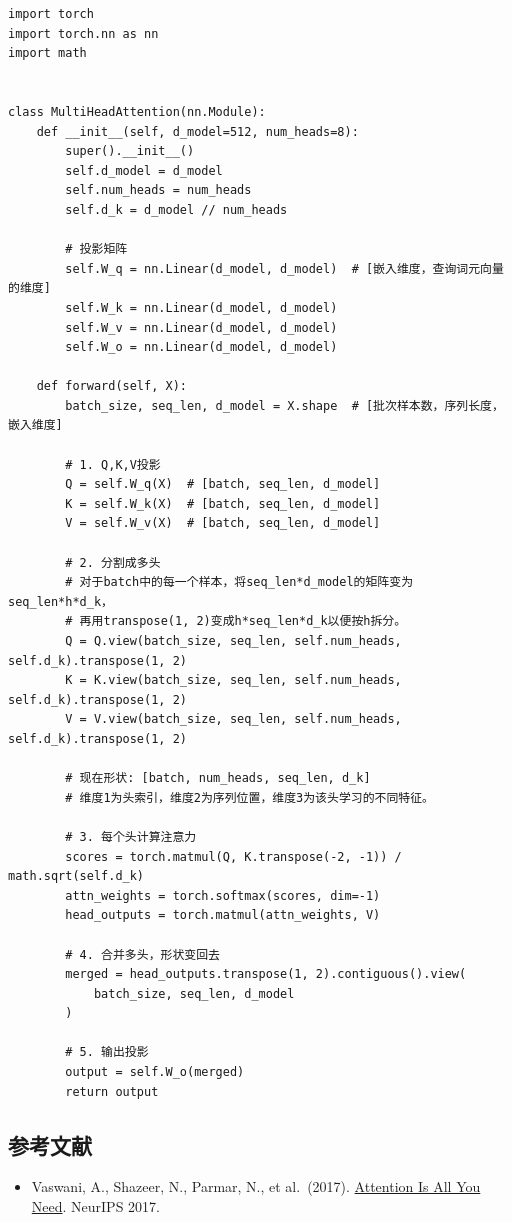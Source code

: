 \begin{verbatim}
import torch
import torch.nn as nn
import math


class MultiHeadAttention(nn.Module):
    def __init__(self, d_model=512, num_heads=8):
        super().__init__()
        self.d_model = d_model
        self.num_heads = num_heads
        self.d_k = d_model // num_heads

        # 投影矩阵
        self.W_q = nn.Linear(d_model, d_model)  # [嵌入维度，查询词元向量的维度]
        self.W_k = nn.Linear(d_model, d_model)
        self.W_v = nn.Linear(d_model, d_model)
        self.W_o = nn.Linear(d_model, d_model)

    def forward(self, X):
        batch_size, seq_len, d_model = X.shape  # [批次样本数，序列长度，嵌入维度]

        # 1. Q,K,V投影
        Q = self.W_q(X)  # [batch, seq_len, d_model]
        K = self.W_k(X)  # [batch, seq_len, d_model]
        V = self.W_v(X)  # [batch, seq_len, d_model]

        # 2. 分割成多头
        # 对于batch中的每一个样本，将seq_len*d_model的矩阵变为seq_len*h*d_k，
        # 再用transpose(1, 2)变成h*seq_len*d_k以便按h拆分。
        Q = Q.view(batch_size, seq_len, self.num_heads, self.d_k).transpose(1, 2)
        K = K.view(batch_size, seq_len, self.num_heads, self.d_k).transpose(1, 2)
        V = V.view(batch_size, seq_len, self.num_heads, self.d_k).transpose(1, 2)

        # 现在形状: [batch, num_heads, seq_len, d_k]
        # 维度1为头索引，维度2为序列位置，维度3为该头学习的不同特征。

        # 3. 每个头计算注意力
        scores = torch.matmul(Q, K.transpose(-2, -1)) / math.sqrt(self.d_k)
        attn_weights = torch.softmax(scores, dim=-1)
        head_outputs = torch.matmul(attn_weights, V)

        # 4. 合并多头，形状变回去
        merged = head_outputs.transpose(1, 2).contiguous().view(
            batch_size, seq_len, d_model
        )

        # 5. 输出投影
        output = self.W_o(merged)
        return output
\end{verbatim}

\hypertarget{ux53c2ux8003ux6587ux732e-66}{%
\subsection{参考文献}\label{ux53c2ux8003ux6587ux732e-66}}

\begin{itemize}
\tightlist
\item
  Vaswani, A., Shazeer, N., Parmar, N., et al.~(2017). \href{https://arxiv.org/abs/1706.03762}{Attention Is All You Need}. NeurIPS 2017.
\end{itemize}

